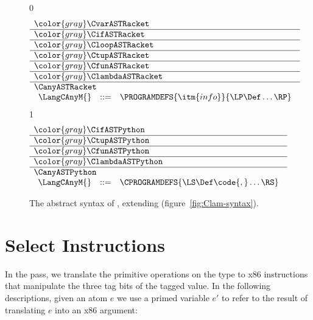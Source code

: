 \documentclass[7x10]{TimesAPriori_MIT}%
\newcommand{\gray}[1]{{\color{gray} #1}}
\def\racketEd{0}
\def\pythonEd{1}
\def\edition{1}
\newcommand{\pythonColor}[0]{}
\numberwithin{theorem}{chapter}
\numberwithin{definition}{chapter}
\numberwithin{equation}{chapter}
\begin{document}
\begin{figure}[tp]
  \begin{tcolorbox}[colback=white]
\small
{\if\edition\racketEd
\[
\begin{array}{l}
  \gray{\CvarASTRacket} \\ \hline
  \gray{\CifASTRacket} \\ \hline
  \gray{\CloopASTRacket} \\ \hline
  \gray{\CtupASTRacket} \\ \hline
  \gray{\CfunASTRacket} \\ \hline
  \gray{\ClambdaASTRacket} \\ \hline
  \CanyASTRacket \\
\begin{array}{lcl}
\LangCAnyM{} & ::= & \PROGRAMDEFS{\itm{info}}{\LP\Def\ldots\RP}
\end{array}
\end{array}
\]
\fi}
{\if\edition\pythonEd\pythonColor
\[
  \begin{array}{l}
  \gray{\CifASTPython} \\ \hline
  \gray{\CtupASTPython} \\ \hline
  \gray{\CfunASTPython} \\ \hline
  \gray{\ClambdaASTPython} \\ \hline
  \CanyASTPython \\
  \begin{array}{lcl}
    \LangCAnyM{} & ::= & \CPROGRAMDEFS{\LS\Def\code{,}\ldots\RS} 
  \end{array}
  \end{array}
\]
\fi}
  \end{tcolorbox}

\caption{The abstract syntax of \LangCAny{}, extending \LangCLam{} (figure~\ref{fig:Clam-syntax}).}
\label{fig:c5-syntax}
\end{figure}


\section{Select Instructions}
\label{sec:select-Lany}

In the  pass, we translate the primitive
operations on the \ANYTY{} type to x86 instructions that manipulate
the three tag bits of the tagged value. In the following descriptions,
given an atom $e$ we use a primed variable $e'$ to refer to the result
of translating $e$ into an x86 argument:
\end{document}
